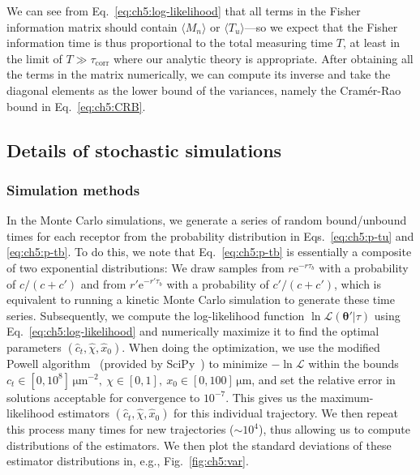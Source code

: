 We can see from Eq.~\eqref{eq:ch5:log-likelihood} that all terms in the Fisher information matrix should contain $\langle M_n\rangle$ or $\langle T_u\rangle$---so we expect that the Fisher information time is thus proportional to the total measuring time $T$, at least in the limit of $T\gg\tau_\textrm{corr}$ where our analytic theory is appropriate.
After obtaining all the terms in the matrix numerically, we can compute its inverse and take the diagonal elements as the lower bound of the variances, namely the Cram\'{e}r-Rao bound in Eq.~\eqref{eq:ch5:CRB}.


\subsection{Details of stochastic simulations}
\label{sec:ch5:simulations}

\subsubsection{Simulation methods}

In the Monte Carlo simulations, we generate a series of random bound/unbound times for each receptor from the probability distribution in Eqs.~\eqref{eq:ch5:p-tu} and \eqref{eq:ch5:p-tb}.
To do this, we note that Eq.~\eqref{eq:ch5:p-tb} is essentially a composite of two exponential distributions: We draw samples from $r\mathrm{e}^{-r\tau_b}$ with a probability of $c/(c+c')$ and from $r'\mathrm{e}^{-r'\tau_b}$ with a probability of $c'/(c+c')$, which is equivalent to running a kinetic Monte Carlo simulation to generate these time series.
Subsequently, we compute the log-likelihood function $\ln\mathcal{L}(\boldsymbol{\theta}'|{\tau})$ using Eq.~\eqref{eq:ch5:log-likelihood} and numerically maximize it to find the optimal parameters $(\hat{c}_t,\hat{\chi},\hat{x}_0)$.
When doing the optimization, we use the modified Powell algorithm~\cite{powell1964efficient} (provided by SciPy~\cite{virtanen2020scipy}) to minimize $-\ln\mathcal{L}$ within the bounds $c_t\in[0, 10^{8}]\,\mathrm{\mu m}^{-2},~\chi\in[0, 1],~x_0\in[0, 100]\,\mathrm{\mu m}$, and set the relative error in solutions acceptable for convergence to $10^{-7}$.
This gives us the maximum-likelihood estimators $(\hat{c}_t,\hat{\chi},\hat{x}_0)$ for this individual trajectory.
We then repeat this process many times for new trajectories ($\sim 10^4$), thus allowing us to compute distributions of the estimators.
We then plot the standard deviations of these estimator distributions in, e.g., Fig.~\ref{fig:ch5:var}.

